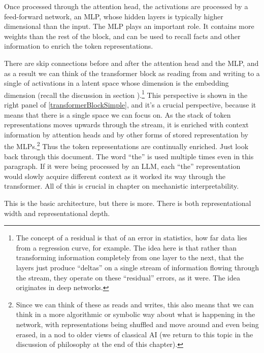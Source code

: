 Once processed through the attention head, the activations are processed by a feed-forward network, an MLP, whose hidden layers is typically higher dimensional than the input.	The MLP plays an important role. It contains more weights than the rest of the block, and can be used to recall facts and other information to enrich the token representations. 

There are skip connections before and after the attention head and the MLP, and as a result we can think of the transformer block as reading from and writing to a single  of activations in a latent space \cite{elhage2021mathematical, milliere2024philosophical2} whose dimension is the embedding dimension (recall the discussion in section ).\footnote{The concept of a residual is that of an error in statistics, how far data lies from a regression curve, for example. The idea here is that rather than transforming information completely from one layer to the next, that the layers just produce ``deltas'' on a single stream of information flowing through the stream, they operate on these ``residual'' errors, as it were. The idea originates in deep networks.}  This perspective is  shown in the right panel of \ref{transformerBlockSimple}, and it's a crucial perspective, because it means that there is a single space we can focus on. As the stack of token representations moves upwards through the stream, it is enriched with context information by attention heads and by other forms of stored representation by the MLPs.\footnote{Since we can think of these as reads and writes, this also means that we can think in a more algorithmic or symbolic way about what is happening in the network, with representations being shuffled and move around and even being erased, in a nod to older views of classical AI (we return to this topic in the discussion of philosophy at the end of this chapter).}  Thus the token representations are continually enriched. Just look back through this document. The word ``the'' is used multiple times even in this paragraph. If it were being processed by an LLM, each ``the'' representation would slowly acquire different context as it worked its way through the transformer. All of this is crucial in chapter  on mechanistic interpretability. 

This is the basic architecture, but there is more. There is both representational width and representational depth.
 
